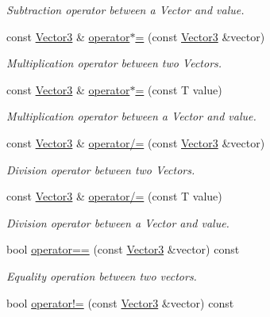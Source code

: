 \begin{DoxyCompactItemize}
\begin{DoxyCompactList}\small\item\em Subtraction operator between a Vector and value. \end{DoxyCompactList}\item 
const \hyperlink{classsparky_1_1_vector3}{Vector3} \& \hyperlink{classsparky_1_1_vector3_a299f7b08a8a0c15ff97fc37b69302f78}{operator$\ast$=} (const \hyperlink{classsparky_1_1_vector3}{Vector3} \&vector)
\begin{DoxyCompactList}\small\item\em Multiplication operator between two Vectors. \end{DoxyCompactList}\item 
const \hyperlink{classsparky_1_1_vector3}{Vector3} \& \hyperlink{classsparky_1_1_vector3_ab09c1ee125f2affa4a29074006729d14}{operator$\ast$=} (const T value)
\begin{DoxyCompactList}\small\item\em Multiplication operator between a Vector and value. \end{DoxyCompactList}\item 
const \hyperlink{classsparky_1_1_vector3}{Vector3} \& \hyperlink{classsparky_1_1_vector3_a2728746b13955708d966e69cea857013}{operator/=} (const \hyperlink{classsparky_1_1_vector3}{Vector3} \&vector)
\begin{DoxyCompactList}\small\item\em Division operator between two Vectors. \end{DoxyCompactList}\item 
const \hyperlink{classsparky_1_1_vector3}{Vector3} \& \hyperlink{classsparky_1_1_vector3_a8f29767e7af0c0b65b00a2e40e609507}{operator/=} (const T value)
\begin{DoxyCompactList}\small\item\em Division operator between a Vector and value. \end{DoxyCompactList}\item 
bool \hyperlink{classsparky_1_1_vector3_ad6aeec8338845d805efa9f2f2ef37c67}{operator==} (const \hyperlink{classsparky_1_1_vector3}{Vector3} \&vector) const 
\begin{DoxyCompactList}\small\item\em Equality operation between two vectors. \end{DoxyCompactList}\item 
bool \hyperlink{classsparky_1_1_vector3_ad7d0e0294eeabf000048259977011350}{operator!=} (const \hyperlink{classsparky_1_1_vector3}{Vector3} \&vector) const 

\end{DoxyCompactItemize}
